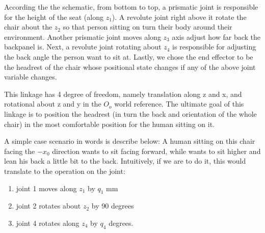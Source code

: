 \documentclass[12pt, letterpaper]{amsart} %
\numberwithin{equation}{section}
\begin{document}
According the the schematic, from bottom to top, a prismatic joint is responsible for the height of the seat (along $z_1$). A revolute joint right above it rotate the chair about the $z_2$  so that person sitting on turn their body around their environment. Another prismatic joint moves along $z_3$ axis adjust how far back the backpanel is. Next, a revolute joint rotating about $z_4$ is responsible for adjusting the back angle the person want to sit at. Lastly, we chose the end effector to be the headrest of the chair whose positional state changes if any of the above joint variable changes.
\par
This linkage has 4 degree of freedom, namely translation along z and x, and rotational about z and y in the $O_o$ world reference. The ultimate goal of this linkage is to position the headrest (in turn the back and orientation of the whole chair) in the most comfortable position for the human sitting on it.
\par
A simple case scenario in words is describe below: A human sitting on this chair facing the $-x_0$ direction wants to sit facing forward, while wants to sit higher and lean his back a little bit to the back. Intuitively, if we are to do it, this would translate to the operation on the joint:
\begin{enumerate}
\item joint 1 moves along $z_1$ by $q_1$ mm  
\item joint 2 rotates about $z_2$ by 90 degrees
\item joint 4 rotates along $z_4$ by $q_4$ degrees.  
\end{enumerate}
\end{document}
